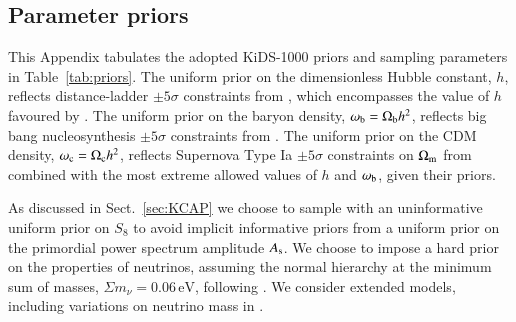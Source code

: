\begin{appendix}
\section{Parameter priors}
\label{app:priors}
This Appendix tabulates the adopted KiDS-1000 priors and sampling parameters in Table~\ref{tab:priors}.   
The uniform prior on the dimensionless Hubble constant, $h$, reflects distance-ladder $\pm 5 \sigma$ constraints from \citet{riess/etal:2016}, which encompasses the value of $h$ favoured by \citet{planck/etal:2018}.  
The uniform prior on the baryon density, $\omega_{\rm b}= \Omega_{\rm b}h^2$, reflects big bang nucleosynthesis $\pm 5 \sigma$ constraints from \citet{olive/etal:2014}.   
The uniform prior on the CDM density, $\omega_{\rm c} = \Omega_{\rm c}h^2$, reflects Supernova Type Ia $\pm 5 \sigma$ constraints on $\Omega_{\rm m}$ from \citet{scolnic/etal:2018} combined with the most extreme allowed values of $h$ and $\omega_{\rm b}$, given their priors.   

As discussed in Sect.~\ref{sec:KCAP} we choose to sample with an uninformative uniform prior on $S_8$ to avoid implicit informative priors from a uniform prior on the primordial power spectrum amplitude $A_{\rm s}$.    
We choose to impose a hard prior on the properties of neutrinos, assuming the normal hierarchy at the minimum sum of masses, $\Sigma m_\nu = 0.06\,\mathrm{eV}$, following \citet{planck/etal:2018}.  
We consider extended models, including variations on neutrino mass in \citet{troester/etal:inprep}.


\end{appendix}
